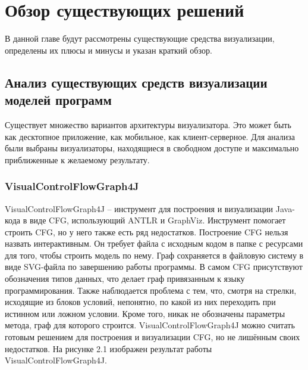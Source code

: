 \chapter{Обзор существующих решений} \label{ch2}
В данной главе будут рассмотрены существующие средства визуализации, определены их плюсы и минусы и указан краткий обзор.
\section{Анализ существующих средств визуализации моделей программ} \label{ch2:sec1}
Существует множество вариантов архитектуры визуализатора. Это может быть как десктопное приложение, как мобильное, как клиент-серверное. Для анализа были выбраны визуализаторы, находящиеся в свободном доступе и максимально приближенные к желаемому результату.
\subsection{VisualControlFlowGraph4J} \label{ch2:subsec-title-abbr}
VisualControlFlowGraph4J – инструмент для построения и визуализации Java-кода в виде CFG, использующий ANTLR и GraphViz.
Инструмент помогает строить CFG, но у него также есть ряд недостатков. Построение CFG нельзя назвать интерактивным. Он требует файла с исходным кодом в папке с ресурсами для того, чтобы строить модель по нему. Граф сохраняется в файловую систему в виде SVG-файла по завершению работы программы. В самом CFG присутствуют обозначения типов данных, что делает граф привязанным к языку программирования. Также наблюдается проблема с тем, что, смотря на стрелки, исходящие из блоков условий, непонятно, по какой из них переходить при истинном или ложном условии. Кроме того, никак не обозначены параметры метода, граф для которого строится.
VisualControlFlowGraph4J можно считать готовым решением для построения и визуализации CFG, но не лишённым своих недостатков. На рисунке 2.1 изображен результат работы VisualControlFlowGraph4J.

